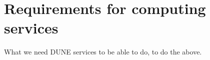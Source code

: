 %
%
%
%


\section{Requirements for computing services}

What we need DUNE services to be able to do, to do the above.








